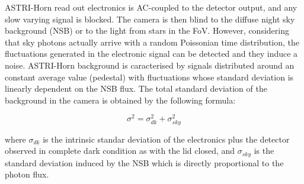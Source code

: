 ASTRI-Horn read out electronics is AC-coupled to the detector output, and any slow varying signal is  blocked.
The camera is then blind to the diffuse night sky background (NSB) or to the light from stars in the FoV.   However, considering that sky photons actually arrive with a random Poissonian time distribution, the fluctuations generated in the electronic signal can be detected and they induce a noise. ASTRI-Horn  background is caracterised by signals distributed around an constant average value (pedestal) with fluctuations whose standard deviation is linearly dependent on the NSB flux. 
The total standard deviation of the background in the camera is obtained by the following formula:

\begin{equation}
\sigma^2=\sigma^2_{dk}+\sigma^2_{sky}
\end{equation}

\noindent
where $\sigma_{dk}$ is the intrinsic standar deviation of the electronics plus the detector observed in complete dark condition as with the lid closed, and $\sigma_{sky}$ is the standard deviation induced by the  NSB  which is directly proportional to the photon flux.

